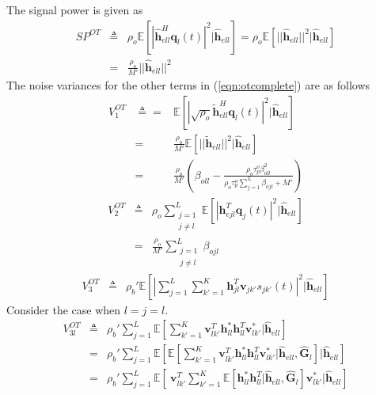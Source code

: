 \documentclass[10pt, a4paper, twoside,fleqn]{article}
\begin{document}
The signal power is given as
\begin{eqnarray}
SP^{OT} &\triangleq& \rho_o\mathbb{E}[|\pmb{\hat h}_{ell}^H \pmb{q}_l(t)|^2 | \pmb{\hat h}_{ell}] = \rho_o\mathbb{E}[||\pmb{\hat h}_{ell}||^2 | \pmb{\hat h}_{ell}] \nonumber \\     &=& \frac{\rho_o}{M'} ||\pmb{\hat h}_{ell}||^2
\end{eqnarray}
The noise variances for the other terms in (\ref{eqn:otcomplete}) are as follows
\begin{eqnarray}\label{eqn:otv1}
	V_1^{OT} &\triangleq=& \mathbb{E}[|\sqrt{\rho_o}\pmb{\widetilde{h}}_{ell}^H \pmb{q}_l(t)|^2|\pmb{\hat h}_{ell}] \nonumber \\
            &=& \frac{\rho_o}{M'} \mathbb{E}[||\pmb{\widetilde{h}}_{ell}||^2 |\pmb{\hat h}_{ell}] \nonumber \\
            &=& \frac{\rho_o}{M'}\left(\beta_{oll}-\frac{\rho_o\tau_p^o\beta^2_{oll}}{\rho_o\tau_p^o\sum\limits_{j=1}^{L}\beta_{ojl}+M'}\right)          
\end{eqnarray}
\begin{eqnarray}\label{eqn:otv2}
	V_2^{OT} &\triangleq& \rho_o \sum_{\substack{j=1 \\ j \neq l}}^{L} \mathbb{E}[|\pmb{h}^T_{ejl} \pmb{q}_j(t)|^2|\pmb{\hat h}_{ell}] \nonumber \\
            &=& \frac{\rho_o}{M'} \sum_{\substack{j=1 \\ j\neq l}}^{L} \beta_{ojl}
\end{eqnarray}
\begin{eqnarray}\label{eqn:v3ot}
	V_3^{OT} &\triangleq& \rho_b' \mathbb{E}\left[\left| \sum_{j=1}^{L}\sum_{k'=1}^{K} \pmb{h}^T_{jl} \pmb{v}_{jk'}s_{jk'}(t) \right|^2 | \pmb{\hat h}_{ell} \right] 
\end{eqnarray}
Consider the case when $l=j=l$.
\begin{eqnarray}
     V_{3l}^{OT} &\triangleq& \rho_b' \sum_{j=1}^{L} \mathbb{E}\left[\sum_{k'=1}^{K} \pmb{v}_{lk'}^T \pmb{h}_{ll}^*  \pmb{h}_{ll}^T \pmb{v}_{lk'}^*| \pmb{\hat h}_{ell} \right] \nonumber \\
            &=& \rho_b' \sum_{j=1}^{L} \mathbb{E}\left[\mathbb{E}\left[\sum_{k'=1}^{K} \pmb{v}^T_{lk'} \pmb{h}_{ll}^*  \pmb{h}_{ll}^T \pmb{v}_{lk'}^*| \pmb{\hat h}_{ell},  \pmb{\hat G}_{l} \right] | \pmb{\hat h}_{ell}\right] \nonumber \\
            &=& \rho_b' \sum_{j=1}^{L} \mathbb{E}\left[\ \pmb{v}^T_{lk'}\sum_{k'=1}^{K} \mathbb{E}\left[ \pmb{h}_{ll}^*  \pmb{h}^T_{ll} | \pmb{\hat h}_{ell},  \pmb{\hat G}_{l} \right] \pmb{v}_{lk'}^*| \pmb{\hat h}_{ell}\right]
\end{eqnarray}
\end{document}

